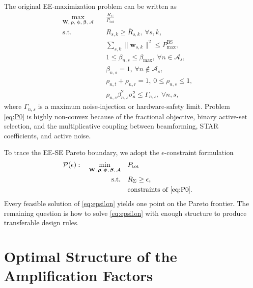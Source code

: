 \documentclass[journal]{IEEEtran}
\begin{document}
The original EE-maximization problem can be written as
\begin{equation}
\begin{aligned}
\max_{\mathbf{W},\,\bm{\rho},\,\bm{\phi},\,\bm{\beta},\,\mathcal{A}}
\quad & \frac{R_\Sigma}{P_{\mathrm{tot}}} \\
\text{s.t.}\quad &
R_{s,k}\ge \bar{R}_{s,k},\ \forall s,k, \\
&
\sum_{s,k}\|\mathbf{w}_{s,k}\|^2 \le P_{\max}^{\mathrm{BS}},\\
&
1\le \beta_{n,s}\le \beta_{\max},\ \forall n\in\mathcal{A}_s,\\
&
\beta_{n,s}=1,\ \forall n\notin\mathcal{A}_s,\\
&
\rho_{n,t}+\rho_{n,r}=1,\ 0\le \rho_{n,s}\le 1,\\
&
\rho_{n,s}\beta_{n,s}^2\sigma_a^2 \le \Gamma_{n,s},\ \forall n,s,
\end{aligned}
\label{eq:P0}
\end{equation}
where $\Gamma_{n,s}$ is a maximum noise-injection or hardware-safety limit. Problem \eqref{eq:P0} is highly non-convex because of the fractional objective, binary active-set selection, and the multiplicative coupling between beamforming, STAR coefficients, and active noise.

To trace the EE-SE Pareto boundary, we adopt the $\epsilon$-constraint formulation
\begin{equation}
\begin{aligned}
\mathcal{P}(\epsilon):\quad
\min_{\mathbf{W},\,\bm{\rho},\,\bm{\phi},\,\bm{\beta},\,\mathcal{A}}
\quad & P_{\mathrm{tot}} \\
\text{s.t.}\quad &
R_\Sigma \ge \epsilon, \\
& \text{constraints of \eqref{eq:P0}.}
\end{aligned}
\label{eq:epsilon}
\end{equation}
Every feasible solution of \eqref{eq:epsilon} yields one point on the Pareto frontier. The remaining question is how to solve \eqref{eq:epsilon} with enough structure to produce transferable design rules.

\section{Optimal Structure of the Amplification Factors}
\end{document}
